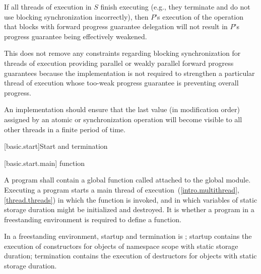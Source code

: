 \pnum
\begin{note}
If all threads of execution in $S$ finish executing (e.g., they terminate
and do not use blocking synchronization incorrectly), then $P$'s execution
of the operation that blocks with forward progress guarantee delegation will not
result in $P$'s progress guarantee being effectively weakened.
\end{note}

\pnum
\begin{note}
This does not remove any constraints regarding blocking synchronization for
threads of execution providing parallel or weakly parallel forward progress
guarantees because the implementation is not required to strengthen a particular
thread of execution whose too-weak progress guarantee is preventing overall progress.
\end{note}

\pnum
An implementation should ensure that the last value (in modification order)
assigned by an atomic or synchronization operation will become visible to all
other threads in a finite period of time.%
%

[basic.start]{Start and termination}

[basic.start.main]{ function}

\pnum
{}%
A program shall contain a global function called 
attached to the global module.
Executing a program starts a main thread of execution~(\ref{intro.multithread}, \ref{thread.threads})
in which the  function is invoked,
and in which variables of static storage duration
might be initialized and destroyed.
It is 
whether a program in a freestanding environment is required to define a 
function.
\begin{note}
In a freestanding environment, startup and termination is
; startup contains the
execution of constructors for objects of namespace scope with static storage duration;
termination contains the execution of destructors for objects with static storage
duration.
\end{note}

